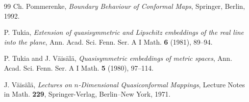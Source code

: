 \documentclass[11pt]{amsart}
\numberwithin{equation}{section}
\theoremstyle{definition} %
\theoremstyle{remarkstyle}
\begin{document}
\begin{thebibliography}{99}
 Ch. Pommerenke, {\it Boundary Behaviour of Conformal Maps},
Springer, Berlin, 1992.

 P. Tukia, {\it Extension of quasisymmetric and Lipschitz embeddings of the real line into the plane}, Ann. Acad. Sci. Fenn. Ser. A I Math. {\bf 6} (1981), 89--94.

 P. Tukia and J. V\"ais\"al\"a, {\it Quasisymmetric embeddings of metric spaces}, Ann. Acad. Sci. Fenn. Ser. A I Math. {\bf 5} (1980), 97--114.

 J. V\"ais\"al\"a, {\it Lectures on $n$-Dimensional Quasiconformal Mappings}, Lecture Notes in Math. {\bf 229}, Springer-Verlag, Berlin--New York, 1971.

\end{thebibliography}
\end{document}
